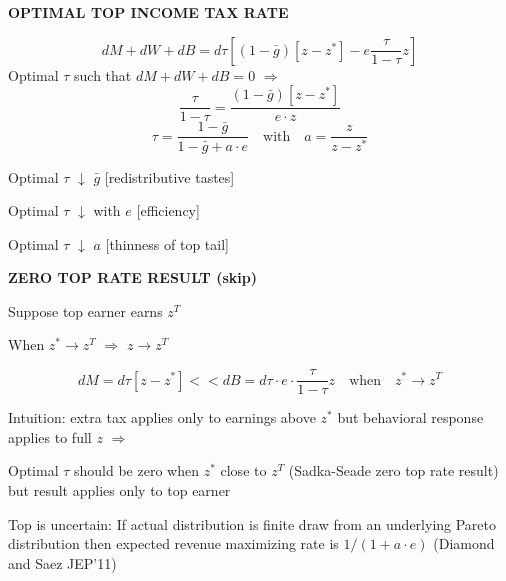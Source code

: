 \documentclass[landscape]{slides}
\begin{document}
\begin{slide}
\begin{center}
{\bf OPTIMAL TOP INCOME TAX RATE}
\end{center}
$$dM+dW+dB=d\tau \left [ (1-\bar{g}) [z-z^*]   - e
\frac{\tau}{1-\tau} z \right ] $$ Optimal $\tau$ such that
$dM+dW+dB=0$ $\Rightarrow$
$$\frac{\tau}{1-\tau}=\frac{(1-\bar{g})[z-z^*]}
{e \cdot z}$$
$$\tau=\frac{1-\bar{g}}{1-\bar{g}+a \cdot e} \quad \mathrm{with} \quad
a=\frac{z}{z-z^*}$$

Optimal $\tau$
$\downarrow$ $\bar{g}$ [redistributive tastes]

Optimal $\tau$ $\downarrow$ with $e$ [efficiency]

Optimal $\tau$ $\downarrow$ $a$ [thinness of top tail]

\end{slide}


\begin{slide}
\begin{center}
{\bf ZERO TOP RATE RESULT (skip)}
\end{center}
Suppose top earner earns $z^T$ 
 
When $z^* \rightarrow z^T$ $\Rightarrow$ $z  \rightarrow  z^T $

\[ dM=d\tau [z-z^*]<< dB= d\tau \cdot  e \cdot
\frac{\tau}{1-\tau} z \quad \mathrm{when} \quad z^* \rightarrow z^T \]

Intuition: extra tax applies only to earnings above $z^*$ but
behavioral response applies to full $z$ $\Rightarrow$

Optimal $\tau$ should be zero when $z^*$ close to $z^T$
(Sadka-Seade zero top rate result) but result applies only to top earner

Top is uncertain: If actual distribution is finite draw from an underlying Pareto
distribution then expected revenue maximizing rate is $1/(1+a\cdot e)$
(Diamond and Saez JEP'11)
\end{slide}


%
%
%
%
\end{document}
